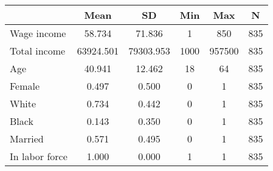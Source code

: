 {
\def\sym#1{\ifmmode^{#1}\else\(^{#1}\)\fi}
\begin{tabular}{l*{1}{ccccc}}
\toprule
                    &        Mean&          SD&         Min&         Max&           N\\
\midrule
Wage income         &      58.734&      71.836&           1&         850&         835\\
Total income        &   63924.501&   79303.953&        1000&      957500&         835\\
Age                 &      40.941&      12.462&          18&          64&         835\\
Female              &       0.497&       0.500&           0&           1&         835\\
White               &       0.734&       0.442&           0&           1&         835\\
Black               &       0.143&       0.350&           0&           1&         835\\
Married             &       0.571&       0.495&           0&           1&         835\\
In labor force      &       1.000&       0.000&           1&           1&         835\\
\bottomrule
\end{tabular}
}
